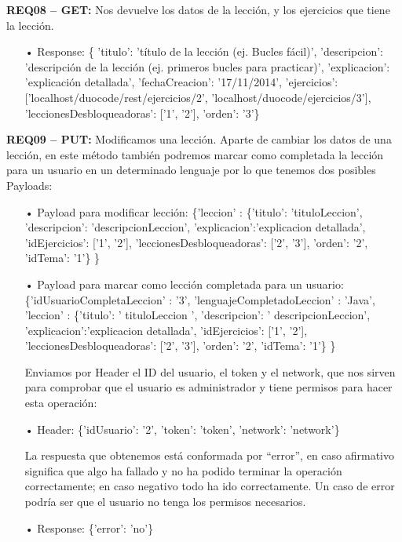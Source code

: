 \textbf{REQ08 – GET:} Nos devuelve los datos de la lección, y los ejercicios que tiene la lección.
\begin{itemize}

\item[•]Response:
\{ 'titulo': 'título de la lección (ej. Bucles fácil)', 'descripcion': 'descripción de la lección (ej. primeros bucles para practicar)', 'explicacion': 'explicación detallada', 'fechaCreacion': '17/11/2014', 'ejercicios': ['localhost/duocode/rest/ejercicios/2', 'localhost/duocode/ejercicios/3'], 'leccionesDesbloqueadoras': ['1', '2'], 'orden': '3'\}
\end{itemize}

\textbf{REQ09 – PUT:} Modificamos una lección. Aparte de cambiar los datos de una lección, en este método también podremos marcar como completada la lección para un usuario en un determinado lenguaje por lo que tenemos dos posibles Payloads:

\begin{itemize}
\item[•]Payload para modificar lección:
\{'leccion' : \{'titulo': 'tituloLeccion', 'descripcion': 'descripcionLeccion', 'explicacion':'explicacion detallada', 'idEjercicios': ['1', '2'], 'leccionesDesbloqueadoras': ['2', '3'], 'orden': '2', 'idTema': '1'\} \}

\item[•]
Payload para marcar como lección completada para un usuario:
\{'idUsuarioCompletaLeccion' : '3', 'lenguajeCompletadoLeccion' : 'Java', 'leccion' : \{'titulo': ' tituloLeccion ', 'descripcion': ' descripcionLeccion', 'explicacion':'explicacion detallada', 'idEjercicios': ['1', '2'], 'leccionesDesbloqueadoras': ['2', '3'], 'orden': '2', 'idTema': '1'\} \}

\vspace{1em}
Enviamos por Header el ID del usuario, el token y el network, que nos sirven para comprobar que el usuario es administrador y tiene permisos para hacer esta operación:

\item[•]Header:
\{'idUsuario': '2', 'token': 'token', 'network': 'network'\}
\vspace{1em}

La respuesta que obtenemos está conformada por “error”, en caso afirmativo significa que algo ha fallado y no ha podido terminar la operación correctamente; en caso negativo todo ha ido correctamente. Un caso de error podría ser que el usuario no tenga los permisos necesarios.
\item[•]Response: 
\{'error': 'no'\}
\end{itemize}

